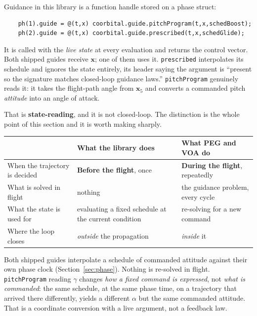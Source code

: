 \documentclass[11pt]{article}
\newcommand{\code}[1]{\texttt{#1}}
\begin{document}
Guidance in this library is a function handle stored on a phase struct:

\begin{lstlisting}
    ph(1).guide = @(t,x) coorbital.guide.pitchProgram(t,x,schedBoost);
    ph(2).guide = @(t,x) coorbital.guide.prescribed(t,x,schedGlide);
\end{lstlisting}

It is called with the \emph{live state} at every evaluation and returns the
control vector. Both shipped guides receive $\mathbf{x}$; one of them uses it.
\code{prescribed} interpolates its schedule and ignores the state entirely, its
header saying the argument is ``present so the signature matches closed-loop
guidance laws.'' \code{pitchProgram} genuinely reads it: it takes the
flight-path angle from $\mathbf{x}_5$ and converts a commanded pitch
\emph{attitude} into an angle of attack.

That is \textbf{state-reading}, and it is not closed-loop. The distinction is
the whole point of this section and it is worth making sharply.

\begin{center}
\begin{tabular}{p{4.0cm}p{5.2cm}p{5.2cm}}
\toprule
 & What the library does & What PEG and VOA do \\
\midrule
When the trajectory is decided & \textbf{Before the flight}, once  & \textbf{During the flight}, repeatedly \\
What is solved in flight       & nothing                           & the guidance problem, every cycle \\
What the state is used for     & evaluating a fixed schedule at the current condition & re-solving for a new command \\
Where the loop closes          & \emph{outside} the propagation    & \emph{inside} it \\
\bottomrule
\end{tabular}
\end{center}

Both shipped guides interpolate a schedule of commanded attitude against their
own phase clock (Section~\ref{sec:phase}). Nothing is re-solved in flight.
\code{pitchProgram} reading $\gamma$ changes \emph{how a fixed command is
expressed}, not \emph{what is commanded}: the same schedule, at the same phase
time, on a trajectory that arrived there differently, yields a different
$\alpha$ but the same commanded attitude. That is a coordinate conversion with
a live argument, not a feedback law.
\end{document}
